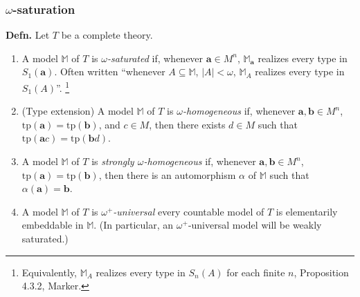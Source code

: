 \documentclass[t,xcolor=dvipsnames,handout]{beamer}
\theoremstyle{theoremFermat}
\theoremstyle{reimann}
\theoremstyle{ACExample}
\def\wec#1{{\mathbf #1}}
\begin{document}
\begin{frame} 
  \frametitle{$\omega$-saturation}

\pause
\noindent
{\bf Defn.} Let $T$ be a complete theory. \pause
\begin{enumerate}
\item A model $\mathbb M$ of $T$ is \emph{$\omega$-saturated}
  if, \pause whenever $\wec{a}\in M^n$, $\mathbb M_{\wec{a}}$
  realizes every type in $S_1(\wec{a})$.
  \pause
  Often written ``whenever $A\subseteq \mathbb M$, $|A|<\omega$,
  $\mathbb M_A$ realizes every type
  in $S_1(A)$''. \footnote{Equivalently,
$\mathbb M_{A}$
    realizes every type in $S_n(A)$ for each finite $n$,
  Proposition 4.3.2, Marker.}
  \pause
\item (Type extension) \pause
  A model $\mathbb M$ of $T$ is \emph{$\omega$-homogeneous}
  if, \pause
  whenever $\wec{a}, \wec{b}\in M^n$, 
  $\textrm{tp}(\wec{a})=\textrm{tp}(\wec{b})$,
  and $c\in M$, then there exists $d\in M$
  such that   $\textrm{tp}(\wec{a}c)=\textrm{tp}(\wec{b}d)$. \pause
\item 
  A model $\mathbb M$ of $T$ is \emph{strongly $\omega$-homogeneous}
  if, \pause
  whenever $\wec{a}, \wec{b}\in M^n$, 
  $\textrm{tp}(\wec{a})=\textrm{tp}(\wec{b})$,
  then there is an automorphism $\alpha$ of $\mathbb M$
  such that $\alpha(\wec{a})=\wec{b}$. \pause
\item A model $\mathbb M$ of $T$ is \emph{$\omega^+$-universal}
  every countable model of $T$ is elementarily
  embeddable in $\mathbb M$. \pause
  (In particular, an $\omega^+$-universal model will be weakly saturated.)
\end{enumerate}
        
\end{frame}
\end{document}

